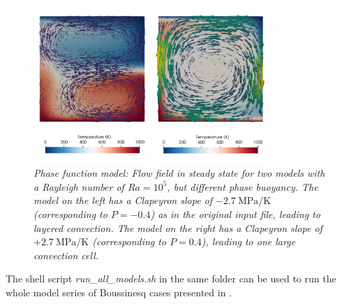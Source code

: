 \begin{figure}
\includegraphics[width=0.8\textwidth]{cookbooks/christensen_yuen_phase_function/doc/flow_field.png}
\caption{\it Phase function model: Flow field in steady state for two models with a Rayleigh number of $Ra = 10^5$, but different phase buoyancy. The model on the left has a Clapeyron slope of $-2.7~\si{\mega\pascal\per\kelvin}$ (corresponding to $P=-0.4$) as in the original input file, leading to layered convection. The model on the right has a Clapeyron slope of $+2.7~\si{\mega\pascal\per\kelvin}$ (corresponding to $P=0.4$), leading to one large convection cell.}
\label{fig:christensen_yuen}
\end{figure}

The shell script {\sl run\_all\_models.sh} in the same folder can be used to run the whole model series of Boussinesq cases presented in \cite{CY85}.  
